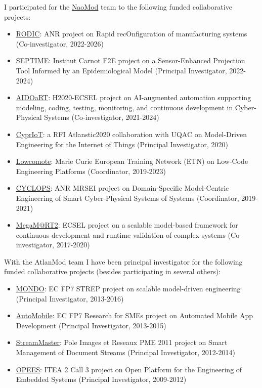I participated for the \href{https://naomod.github.io/}{NaoMod} team to
the following funded collaborative projects:

\begin{itemize}
\tightlist
\item
  \href{https://rodic.ls2n.fr/}{RODIC}: ANR project on Rapid
  recOnfiguration of manufacturing systems (Co-investigator, 2022-2026)
\item
  \href{https://www6.angers-nantes.inrae.fr/bioepar/Recherche/Projets-en-cours/SEPTIME}{SEPTIME}:
  Institut Carnot F2E project on a Sensor-Enhanced Projection Tool
  Informed by an Epidemiological Model (Principal Investigator,
  2022-2024)
\item
  \href{https://www.aidoart.eu/}{AIDOaRT}: H2020-ECSEL project on
  AI-augmented automation supporting modeling, coding, testing,
  monitoring, and continuous development in Cyber-Physical Systems
  (Co-investigator, 2021-2024)
\item
  \href{https://github.com/atlanmod/CyprIoT}{CyprIoT}: a RFI
  Atlanstic2020 collaboration with UQAC on Model-Driven Engineering for
  the Internet of Things (Principal Investigator, 2020)
\item
  \href{https://www.lowcomote.eu/}{Lowcomote}: Marie Curie European
  Training Network (ETN) on Low-Code Engineering Platforms (Coordinator,
  2019-2023)
\item
  \href{http://massimotisi.github.io}{CYCLOPS}: ANR MRSEI project on
  Domain-Specific Model-Centric Engineering of Smart Cyber-Physical
  Systems of Systems (Coordinator, 2019-2021)
\item
  \href{https://megamart2-ecsel.eu/}{MegaM@RT2}: ECSEL project on a
  scalable model-based framework for continuous development and runtime
  validation of complex systems (Co-investigator, 2017-2020)
\end{itemize}

With the AtlanMod team I have been principal investigator for the
following funded collaborative projects (besides participating in
several others):

\begin{itemize}
\tightlist
\item
  \href{http://www.mondo-project.org/}{MONDO}: EC FP7 STREP project on
  scalable model-driven engineering (Principal Investigator, 2013-2016)
\item
  \href{http://automobile.webratio.com/}{AutoMobile}: EC FP7 Research
  for SMEs project on Automated Mobile App Development (Principal
  Investigator, 2013-2015)
\item
  \href{http://www.irccyn.ec-nantes.fr/fr/projets-ivc/projet-streammaster-ivc}{StreamMaster}:
  Pole Images et Reseaux PME 2011 project on Smart Management of
  Document Streams (Principal Investigator, 2012-2014)
\item
  \href{https://itea3.org/project/opees.html}{OPEES}: ITEA 2 Call 3
  project on Open Platform for the Engineering of Embedded Systems
  (Principal Investigator, 2009-2012)
\end{itemize}

